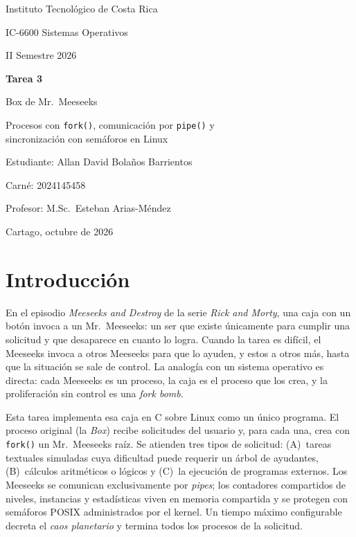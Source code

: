 \documentclass[11pt,letterpaper]{article}
\begin{document}
\begin{titlepage}
\centering
{\large Instituto Tecnológico de Costa Rica\par}
\vspace{0.6cm}
{\large IC-6600 Sistemas Operativos\par}
{\large II Semestre 2026\par}
\vspace{3cm}
{\Huge\bfseries Tarea 3\par}
\vspace{0.4cm}
{\LARGE Box de Mr.\ Meeseeks\par}
\vspace{0.4cm}
{\large Procesos con \texttt{fork()}, comunicación por \texttt{pipe()} y\\ sincronización con semáforos en Linux\par}
\vspace{3.2cm}
{\large Estudiante: Allan David Bolaños Barrientos\par}
{\large Carné: 2024145458\par}
\vspace{0.8cm}
{\large Profesor: M.Sc.\ Esteban Arias-Méndez\par}
\vfill
{\large Cartago, octubre de 2026\par}
\end{titlepage}

\tableofcontents
\newpage

\section{Introducción}

En el episodio \emph{Meeseeks and Destroy} de la serie \emph{Rick and Morty}, una caja
con un botón invoca a un Mr.\ Meeseeks: un ser que existe únicamente para cumplir una
solicitud y que desaparece en cuanto lo logra. Cuando la tarea es difícil, el Meeseeks
invoca a otros Meeseeks para que lo ayuden, y estos a otros más, hasta que la situación
se sale de control. La analogía con un sistema operativo es directa: cada Meeseeks es un
proceso, la caja es el proceso que los crea, y la proliferación sin control es una
\emph{fork bomb}.

Esta tarea implementa esa caja en C sobre Linux como un único programa. El proceso
original (la \emph{Box}) recibe solicitudes del usuario y, para cada una, crea con
\texttt{fork()} un Mr.\ Meeseeks raíz. Se atienden tres tipos de solicitud: (A)~tareas
textuales simuladas cuya dificultad puede requerir un árbol de ayudantes, (B)~cálculos
aritméticos o lógicos y (C)~la ejecución de programas externos. Los Meeseeks se
comunican exclusivamente por \emph{pipes}; los contadores compartidos de niveles,
instancias y estadísticas viven en memoria compartida y se protegen con semáforos POSIX
administrados por el kernel. Un tiempo máximo configurable decreta el \emph{caos
planetario} y termina todos los procesos de la solicitud.
\end{document}
